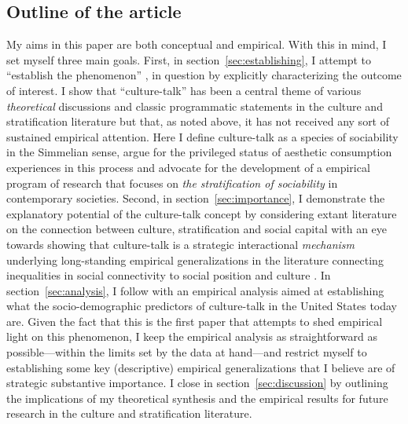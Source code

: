 \subsection{Outline of the article}
My aims in this paper are both conceptual and empirical.  With this in mind, I set myself three main goals.  First, in section~\ref{sec:establishing}, I attempt to ``establish the phenomenon'' \citep{merton87}, in question by explicitly characterizing the outcome of interest. I show that ``culture-talk'' has been a central theme of various \emph{theoretical} discussions and classic programmatic statements in the culture and stratification literature but that, as noted above, it has not received any sort of sustained empirical attention.  Here I define culture-talk as a species of sociability in the Simmelian sense, argue for the privileged status of aesthetic consumption experiences in this process and advocate for the development of a empirical program of research that focuses on  \emph{the stratification of sociability} in contemporary societies. Second, in section~\ref{sec:importance}, I demonstrate the explanatory potential of the culture-talk concept by considering extant literature on the connection between culture, stratification and social capital with an eye towards showing that culture-talk is a strategic interactional \emph{mechanism} underlying long-standing empirical generalizations in the literature connecting inequalities in social connectivity to social position and culture \citep{erickson08}.  In section~\ref{sec:analysis}, I follow with an empirical analysis aimed at establishing what the socio-demographic predictors of culture-talk in the United States today are.  Given the fact that this is the first paper that attempts to shed empirical light on this phenomenon, I keep the empirical analysis as straightforward as possible---within the limits set by the data at hand---and restrict myself to establishing some key (descriptive) empirical generalizations that I believe are of strategic substantive importance.  I close in section~\ref{sec:discussion} by outlining the implications of my theoretical synthesis and the empirical results for future research in the culture and stratification literature.